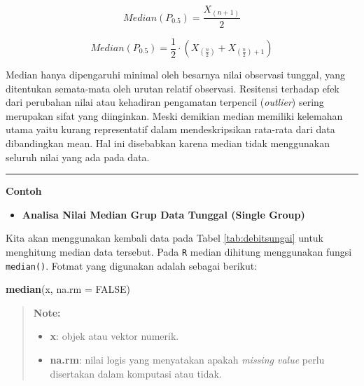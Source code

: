 \documentclass[]{book}
\newenvironment{Shaded}{\begin{snugshade}}{\end{snugshade}}
\newcommand{\KeywordTok}[1]{\textcolor[rgb]{0.13,0.29,0.53}{\textbf{#1}}}
\newcommand{\DataTypeTok}[1]{\textcolor[rgb]{0.13,0.29,0.53}{#1}}
\newcommand{\OtherTok}[1]{\textcolor[rgb]{0.56,0.35,0.01}{#1}}
\newcommand{\NormalTok}[1]{#1}
\providecommand{\tightlist}{%
  \setlength{\itemsep}{0pt}\setlength{\parskip}{0pt}}
\begin{document}
\begin{equation}
  Median (P_{0.5}) =\frac{X_{\left(n+1\right)}}{2}
  \label{eq:med1}
\end{equation}

\begin{equation}
  Median (P_{0.5}) =\frac{1}{2}\cdot\left(X_{\left(\frac{n}{2}\right)}+X_{\left(\frac{n}{2}\right)+1}\right)
  \label{eq:med2}
\end{equation}

Median hanya dipengaruhi minimal oleh besarnya nilai observasi tunggal,
yang ditentukan semata-mata oleh urutan relatif observasi. Resitensi
terhadap efek dari perubahan nilai atau kehadiran pengamatan terpencil
(\emph{outlier}) sering merupakan sifat yang diinginkan. Meski demikian
median memiliki kelemahan utama yaitu kurang representatif dalam
mendeskripsikan rata-rata dari data dibandingkan mean. Hal ini
disebabkan karena median tidak menggunakan seluruh nilai yang ada pada
data.

\begin{center}\rule{0.5\linewidth}{\linethickness}\end{center}

\textbf{Contoh}

\begin{itemize}
\tightlist
\item
  \textbf{Analisa Nilai Median Grup Data Tunggal (Single Group)}
\end{itemize}

Kita akan menggunakan kembali data pada Tabel \ref{tab:debitsungai}
untuk menghitung median data tersebut. Pada \texttt{R} median dihitung
menggunakan fungsi \texttt{median()}. Fotmat yang digunakan adalah
sebagai berikut:

\begin{Shaded}
\begin{Highlighting}[]
\KeywordTok{median}\NormalTok{(x, }\DataTypeTok{na.rm =} \OtherTok{FALSE}\NormalTok{)}
\end{Highlighting}
\end{Shaded}

\begin{quote}
\textbf{Note:}

\begin{itemize}
\tightlist
\item
  \textbf{x}: objek atau vektor numerik.
\item
  \textbf{na.rm}: nilai logis yang menyatakan apakah \emph{missing
  value} perlu disertakan dalam komputasi atau tidak.
\end{itemize}
\end{quote}
\end{document}
